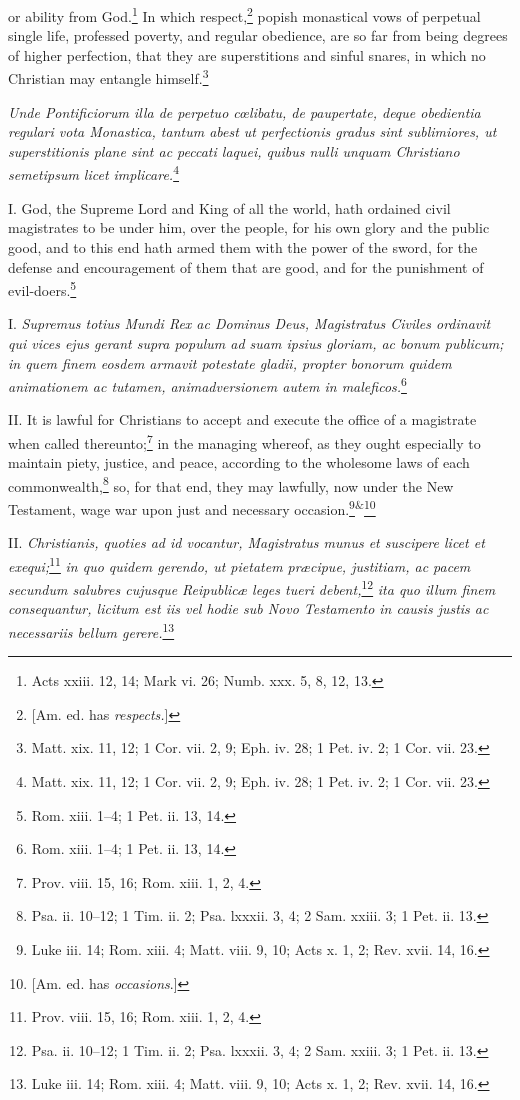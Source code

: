 or ability from God.\footnote{Acts xxiii. 12, 14; Mark vi. 26; Numb. xxx. 5, 8, 12, 13.} In which respect,\footnote{[Am. ed. has \emph{respects.}]} popish monastical vows of perpetual single life, professed poverty, and regular obedience, are so far from being degrees of higher perfection, that they are superstitions and sinful snares, in which no Christian may entangle himself.\footnote{Matt. xix. 11, 12; 1 Cor. vii. 2, 9; Eph. iv. 28; 1 Pet. iv. 2; 1 Cor. vii. 23.}

\emph{Unde Pontificiorum illa de perpetuo cœlibatu, de paupertate, deque obedientia regulari vota Monastica, tantum abest ut perfectionis gradus sint sublimiores, ut superstitionis plane sint ac peccati laquei, quibus nulli unquam Christiano semetipsum licet implicare.}\footnote{Matt. xix. 11, 12; 1 Cor. vii. 2, 9; Eph. iv. 28; 1 Pet. iv. 2; 1 Cor. vii. 23.}


I. God, the Supreme Lord and King of all the world, hath ordained civil magistrates to be under him, over the people, for his own glory and the public good, and to this end hath armed them with the power of the sword, for the defense and encouragement of them that are good, and for the punishment of evil-doers.\footnote{Rom. xiii. 1–4; 1 Pet. ii. 13, 14.}

I. \emph{Supremus totius Mundi Rex ac Dominus Deus, Magistratus Civiles ordinavit qui vices ejus gerant supra populum ad suam ipsius gloriam, ac bonum publicum; in quem finem eosdem armavit potestate gladii, propter bonorum quidem animationem ac tutamen, animadversionem autem in maleficos.}\footnote{Rom. xiii. 1–4; 1 Pet. ii. 13, 14.}

II. It is lawful for Christians to accept and execute the office of a magistrate when called thereunto;\footnote{Prov. viii. 15, 16; Rom. xiii. 1, 2, 4.} in the managing whereof, as they ought especially to maintain piety, justice, and peace, according to the wholesome laws of each commonwealth,\footnote{Psa. ii. 10–12; 1 Tim. ii. 2; Psa. lxxxii. 3, 4; 2 Sam. xxiii. 3; 1 Pet. ii. 13.} so, for that end, they may lawfully, now under the New Testament, wage war upon just and necessary occasion.\footnote{Luke iii. 14; Rom. xiii. 4; Matt. viii. 9, 10; Acts x. 1, 2; Rev. xvii. 14, 16.}\textsuperscript{\&}\footnote{[Am. ed. has \emph{occasions}.]}

II. \emph{Christianis, quoties ad id vocantur, Magistratus munus et suscipere licet et exequi;}\footnote{Prov. viii. 15, 16; Rom. xiii. 1, 2, 4.}\emph{ in quo quidem gerendo, ut pietatem præcipue, justitiam, ac pacem secundum salubres cujusque Reipublicæ leges tueri debent,}\footnote{Psa. ii. 10–12; 1 Tim. ii. 2; Psa. lxxxii. 3, 4; 2 Sam. xxiii. 3; 1 Pet. ii. 13.}\emph{ ita quo illum finem consequantur, licitum est iis vel hodie sub Novo Testamento in causis justis ac necessariis bellum gerere.}\footnote{Luke iii. 14; Rom. xiii. 4; Matt. viii. 9, 10; Acts x. 1, 2; Rev. xvii. 14, 16.}

